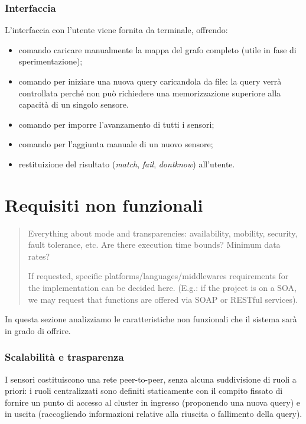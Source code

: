 \documentclass{llncs}
\begin{document}
\subsubsection*{Interfaccia}
L'interfaccia con l'utente viene fornita da terminale, offrendo:
\begin{itemize}
\item comando caricare manualmente la mappa del grafo
  completo (utile in fase di sperimentazione);
\item comando per iniziare una nuova query caricandola da file:
  la query verrà controllata perché non può richiedere una
  memorizzazione superiore alla capacità di un singolo sensore.
\item comando per imporre l'avanzamento di tutti i sensori;
\item comando per l'aggiunta manuale di un nuovo sensore;
\item restituizione del risultato (\emph{match}, \emph{fail},
  \emph{dontknow}) all'utente.
\end{itemize}

\section{Requisiti non funzionali}
\label{sec:nonfunc-req}
\begin{quote}
  Everything about mode and transparencies:
  availability, mobility, security, fault tolerance, etc.
  Are there execution time bounds? Minimum data rates?

  If requested, specific platforms/languages/middlewares requirements
  for the implementation can be decided here.
  (E.g.: if the project is on a SOA, we may request that functions
  are offered via SOAP or RESTful services).
\end{quote}

In questa sezione analizziamo le caratteristiche non funzionali
che il sistema sarà in grado di offrire.

\subsubsection*{Scalabilità e trasparenza}
I sensori costituiscono una rete peer-to-peer,
senza alcuna suddivisione di ruoli a priori: i ruoli centralizzati
sono definiti staticamente con il compito fissato di fornire un punto
di accesso al cluster in ingresso (proponendo una nuova query) e
in uscita (raccogliendo informazioni relative alla riuscita
o fallimento della query).
\end{document}
